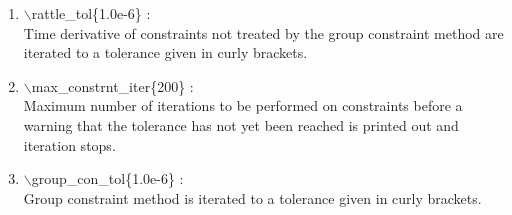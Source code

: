 \documentclass[12pt,titlepage]{article}
\begin{document}
\begin{enumerate}
 \vspace{0.15in} 
 \item   $\backslash$rattle\_tol\{1.0e-6\} : \\
      Time derivative of constraints not treated by the group constraint 
      method are iterated to a tolerance given in curly brackets.


 \vspace{0.15in} 
 \item   $\backslash$max\_constrnt\_iter\{200\} : \\
     Maximum number of iterations to be performed on constraints before a 
     warning that the tolerance has not yet been reached is printed out and 
     iteration stops.

 \vspace{0.15in} 
 \item   $\backslash$group\_con\_tol\{1.0e-6\} : \\
     Group constraint method is iterated to a tolerance given in curly 
     brackets.

%
%
%
%
%

\end{enumerate}
\end{document}
